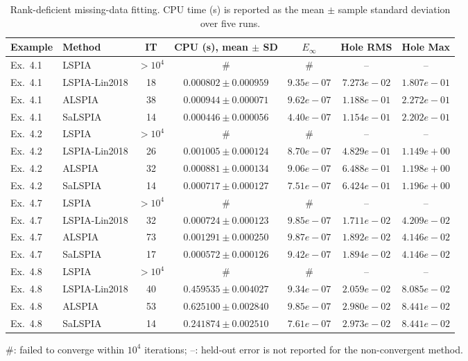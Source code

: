 \begin{table}[H]
\centering
\scriptsize
\caption{Rank-deficient missing-data fitting. CPU time (s) is reported as the mean $\pm$ sample standard deviation over five runs.}
\label{tab:rank_deficient}
\begin{tabular}{llccccc}
\hline
Example & Method & IT & CPU (s), mean $\pm$ SD & $E_\infty$ & Hole RMS & Hole Max \\
\hline
Ex.~4.1 & LSPIA & $>10^4$ & \# & \# & -- & -- \\
Ex.~4.1 & LSPIA-Lin2018 & 18 & $0.000802 \pm 0.000959$ & $9.35e-07$ & $7.273e-02$ & $1.807e-01$ \\
Ex.~4.1 & ALSPIA & 38 & $0.000944 \pm 0.000071$ & $9.62e-07$ & $1.188e-01$ & $2.272e-01$ \\
Ex.~4.1 & SaLSPIA & 14 & $0.000446 \pm 0.000056$ & $4.40e-07$ & $1.154e-01$ & $2.202e-01$ \\
\hline
Ex.~4.2 & LSPIA & $>10^4$ & \# & \# & -- & -- \\
Ex.~4.2 & LSPIA-Lin2018 & 26 & $0.001005 \pm 0.000124$ & $8.70e-07$ & $4.829e-01$ & $1.149e+00$ \\
Ex.~4.2 & ALSPIA & 32 & $0.000881 \pm 0.000134$ & $9.06e-07$ & $6.488e-01$ & $1.198e+00$ \\
Ex.~4.2 & SaLSPIA & 14 & $0.000717 \pm 0.000127$ & $7.51e-07$ & $6.424e-01$ & $1.196e+00$ \\
\hline
Ex.~4.7 & LSPIA & $>10^4$ & \# & \# & -- & -- \\
Ex.~4.7 & LSPIA-Lin2018 & 32 & $0.000724 \pm 0.000123$ & $9.85e-07$ & $1.711e-02$ & $4.209e-02$ \\
Ex.~4.7 & ALSPIA & 73 & $0.001291 \pm 0.000250$ & $9.87e-07$ & $1.892e-02$ & $4.146e-02$ \\
Ex.~4.7 & SaLSPIA & 17 & $0.000572 \pm 0.000126$ & $9.42e-07$ & $1.894e-02$ & $4.146e-02$ \\
\hline
Ex.~4.8 & LSPIA & $>10^4$ & \# & \# & -- & -- \\
Ex.~4.8 & LSPIA-Lin2018 & 40 & $0.459535 \pm 0.004027$ & $9.34e-07$ & $2.059e-02$ & $8.085e-02$ \\
Ex.~4.8 & ALSPIA & 53 & $0.625100 \pm 0.002840$ & $9.85e-07$ & $2.980e-02$ & $8.441e-02$ \\
Ex.~4.8 & SaLSPIA & 14 & $0.241874 \pm 0.002510$ & $7.61e-07$ & $2.973e-02$ & $8.441e-02$ \\
\hline
\end{tabular}
\par\smallskip
\parbox{0.95\textwidth}{\footnotesize \#: failed to converge within $10^4$ iterations; --: held-out error is not reported for the non-convergent method.}
\end{table}
